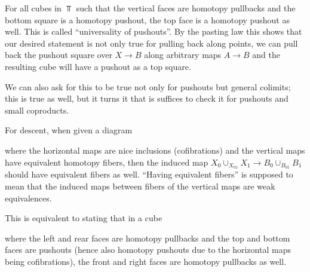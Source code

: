 For all cubes in $\Top$ such that the vertical faces are homotopy pullbacks and the bottom square is a homotopy pushout, the top face is a homotopy pushout as well.
This is called  ``universality of pushouts''.
By the pasting law this shows that our desired statement is not only true for pulling back along points, we can pull back the pushout square over $X\to B$ along arbitrary maps $A\to B$ and the resulting cube will have a pushout as a top square.

We can also ask for this to be true not only for pushouts but general colimits; this is true as well, but it turns it that is suffices to check it for pushouts and small coproducts.

For descent, when given a diagram 
\begin{center}
\end{center}
where the horizontal maps are nice inclusions (cofibrations) and the vertical maps have equivalent homotopy fibers, then the induced map $X_0\cup_{X_{01}}X_1\to B_0\cup_{B_{01}}B_1$ should have equivalent fibers as well.
``Having equivalent fibers'' is supposed to mean that the induced maps between fibers of the vertical maps are weak equivalences.

This is equivalent to stating that in a cube 
\begin{center}
\end{center}
where the left and rear faces are homotopy pullbacks and the top and bottom faces are pushouts (hence also homotopy pushouts due to the horizontal maps being cofibrations), the front and right faces are homotopy pullbacks as well.

